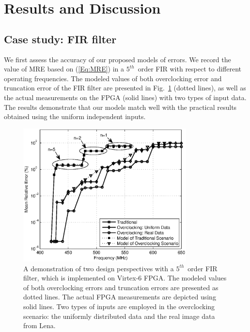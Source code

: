 \documentclass[prodmode,acmtrets]{acmsmall} %
\begin{document}
\section{Results and Discussion}\label{Section_Experiments}
\subsection{Case study: FIR filter}
We first assess the accuracy of our proposed models of errors. We record the value of MRE based on (\ref{Eq:MRE}) in a $5^{th}$~order FIR with respect to different operating frequencies. The modeled values of both overclocking error and truncation error of the FIR filter are presented in Fig.~\ref{Fig:FIR} (dotted lines), as well as the actual measurements on the FPGA (solid lines) with two types of input data. The results demonstrate that our models match well with the practical results obtained using the uniform independent inputs.
\begin{figure}[tbp]
  \centering
  \vspace{-3ex}
  \includegraphics[width=3.5in]{./Figures/Exp/FIR/FIR_Error_New_TCAD.eps}
  \vspace{-2ex}
  \caption{A demonstration of two design perspectives with a $5^{th}$~order FIR filter, which is implemented on Virtex-6 FPGA. The modeled values of both overclocking errors and truncation errors are presented as dotted lines. The actual FPGA measurements are depicted using solid lines. Two types of inputs are employed in the overclocking scenario: the uniformly distributed data and the real image data from Lena.}
  \label{Fig:FIR}
\end{figure}
\end{document}
